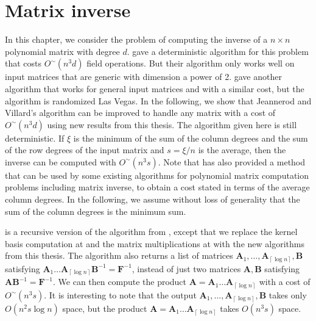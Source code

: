 
\chapter{\label{chap:Matrix-inverse}Matrix inverse}

In this chapter, we consider the problem of computing the inverse
of a $n\times n$ polynomial matrix with degree $d$. \citet{jeannerod-villard:05}
gave a deterministic algorithm for this problem that costs $O^{\sim}\left(n^{3}d\right)$
field operations. But their algorithm only works well on input matrices
that are generic with dimension a power of 2. \citet{storjohann:2008}
gave another algorithm that works for general input matrices and with
a similar cost, but the algorithm is randomized Las Vegas. In the
following, we show that Jeannerod and Villard's algorithm can be improved
to handle any matrix with a cost of $O^{\sim}\left(n^{3}d\right)$
using new results from this thesis. The algorithm given here is still
deterministic.  If $\xi$ is the minimum of the sum of the column
degrees and the sum of the row degrees of the input matrix and $s=\xi/n$
is the average, then the inverse can be computed with $O^{\sim}\left(n^{3}s\right)$.
Note that \citet{GSSV2012} has also provided a method that can be
used by some existing algorithms for polynomial matrix computation
problems including matrix inverse, to obtain a cost stated in terms
of the average column degrees. In the following, we assume without
loss of generality that the sum of the column degrees is the minimum
sum.



 is a recursive version of the algorithm
from \citet{jeannerod-villard:05}, except that we replace the kernel
basis computation at  and
the matrix multiplications at  with the
new algorithms from this thesis. The algorithm also returns a list
of matrices $\mathbf{A}_{1},\dots,\mathbf{A}_{\left\lceil \log n\right\rceil },\mathbf{B}$
satisfying $\mathbf{A}_{1}\dots\mathbf{A}_{\left\lceil \log n\right\rceil }\mathbf{B}^{-1}=\mathbf{F}^{-1}$,
instead of just two matrices $\mathbf{A},\mathbf{B}$ satisfying $\mathbf{A}\mathbf{B}^{-1}=\mathbf{F}^{-1}$.
We can then compute the product $\mathbf{A}=\mathbf{A}_{1}\dots\mathbf{A}_{\left\lceil \log n\right\rceil }$
with a cost of $O^{\sim}\left(n^{3}s\right)$. It is interesting to
note that the output $\mathbf{A}_{1},\dots,\mathbf{A}_{\left\lceil \log n\right\rceil },\mathbf{B}$
takes only $O(n^{2}s\log n)$ space, but the product $\mathbf{A}=\mathbf{A}_{1}\dots\mathbf{A}_{\left\lceil \log n\right\rceil }$
takes $O(n^{3}s)$ space.

